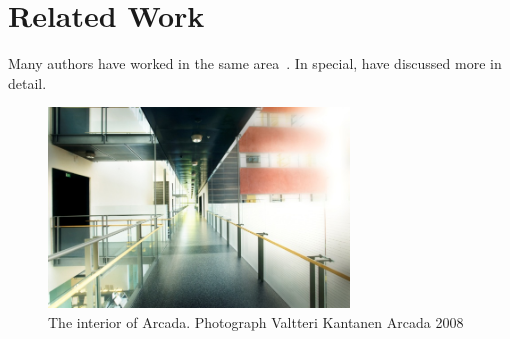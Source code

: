 \section{Related Work}

Many authors have worked in the same area~\citep*{leal2015optimizing}. In special,  \citeauthor{espinosa2019reinforcement} have discussed more in detail.

\kant[3-5]

\begin{figure}
\includegraphics[width=8cm]{figures/arcada.jpg}
\caption{The interior of Arcada. Photograph Valtteri Kantanen Arcada 2008}
\end{figure}

\kant[2]
